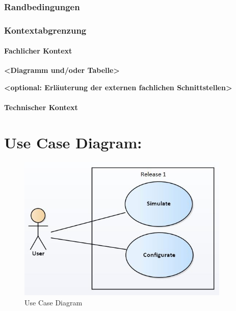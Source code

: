 \subsection{Randbedingungen}\label{section-architecture-constraints}

\subsection{Kontextabgrenzung}\label{section-system-scope-and-context}

\subsubsection{Fachlicher Kontext}\label{_fachlicher_kontext}

\textbf{\textless{}Diagramm und/oder Tabelle\textgreater{}}

\textbf{\textless{}optional: Erläuterung der externen fachlichen
Schnittstellen\textgreater{}}

\subsubsection{Technischer Kontext}\label{_technischer_kontext}

\chapter{Use Case Diagram:}

\begin{figure}[H]
	\centering
	\includegraphics[width=0.9\textwidth]{img/UseCase_Diagram.JPG}
	\caption{Use Case Diagram}
	\label{img:UseCase_Diagram}
\end{figure}

